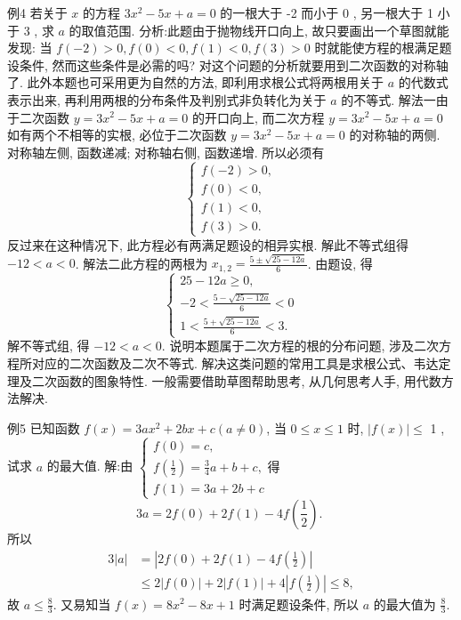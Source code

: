 例4 若关于 $x$ 的方程 $3 x^2-5 x+a=0$ 的一根大于 -2 而小于 0 , 另一根大于 1 小于 3 , 求 $a$ 的取值范围.
分析:此题由于抛物线开口向上, 故只要画出一个草图就能发现: 当 $f(-2)>0, f(0)<0, f(1)<0, f(3)>0$ 时就能使方程的根满足题设条件, 然而这些条件是必需的吗? 对这个问题的分析就要用到二次函数的对称轴了.
此外本题也可采用更为自然的方法, 即利用求根公式将两根用关于 $a$ 的代数式表示出来, 再利用两根的分布条件及判别式非负转化为关于 $a$ 的不等式.
解法一由于二次函数 $y=3 x^2-5 x+a=0$ 的开口向上, 而二次方程 $y=3 x^2-5 x+a=0$ 如有两个不相等的实根, 必位于二次函数 $y=3 x^2-5 x+a=0$ 的对称轴的两侧.
对称轴左侧, 函数递减; 对称轴右侧, 函数递增.
所以必须有
$$
\left\{\begin{array}{l}
f(-2)>0, \\
f(0)<0, \\
f(1)<0, \\
f(3)>0 .
\end{array}\right.
$$
反过来在这种情况下, 此方程必有两满足题设的相异实根.
解此不等式组得 $-12<a<0$.
解法二此方程的两根为 $x_{1,2}=\frac{5 \pm \sqrt{25-12 a}}{6}$. 由题设, 得
$$
\left\{\begin{array}{l}
25-12 a \geqslant 0, \\
-2<\frac{5-\sqrt{25-12 a}}{6}<0 \\
1<\frac{5+\sqrt{25-12 a}}{6}<3 .
\end{array}\right.
$$
解不等式组, 得 $-12<a<0$.
说明本题属于二次方程的根的分布问题, 涉及二次方程所对应的二次函数及二次不等式.
解决这类问题的常用工具是求根公式、韦达定理及二次函数的图象特性.
一般需要借助草图帮助思考, 从几何思考人手, 用代数方法解决.



例5 已知函数 $f(x)=3 a x^2+2 b x+c(a \neq 0)$, 当 $0 \leqslant x \leqslant 1$ 时, $|f(x)| \leqslant$ 1 , 试求 $a$ 的最大值.
解:由 $\left\{\begin{array}{l}f(0)=c, \\ f\left(\frac{1}{2}\right)=\frac{3}{4} a+b+c, \text { 得 } \\ f(1)=3 a+2 b+c\end{array}\right.$
$$
3 a=2 f(0)+2 f(1)-4 f\left(\frac{1}{2}\right) \text {. }
$$
所以
$$
\begin{aligned}
3|a| & =\left|2 f(0)+2 f(1)-4 f\left(\frac{1}{2}\right)\right| \\
& \leqslant 2|f(0)|+2|f(1)|+4\left|f\left(\frac{1}{2}\right)\right| \leqslant 8,
\end{aligned}
$$
故 $a \leqslant \frac{8}{3}$.
又易知当 $f(x)=8 x^2-8 x+1$ 时满足题设条件, 所以 $a$ 的最大值为 $\frac{8}{3}$.



